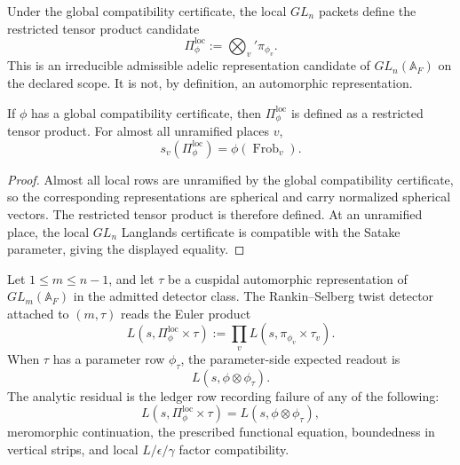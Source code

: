 \begin{definition}
\label{def:unified-reality-gln-local-tensor-product-candidate}
Under the global compatibility certificate, the local $GL_n$ packets
define the restricted tensor product candidate
$$
\Pi_{\phi}^{\mathrm{loc}}
:=
\bigotimes_v'\pi_{\phi_v}.
$$
This is an irreducible admissible adelic representation candidate of
$GL_n(\mathbb A_F)$ on the declared scope. It is not, by definition, an
automorphic representation.
\end{definition}

\begin{theorem}
\label{thm:unified-reality-gln-local-tensor-candidate-readout}
If $\phi$ has a global compatibility certificate, then
$\Pi_{\phi}^{\mathrm{loc}}$ is defined as a restricted tensor product.
For almost all unramified places $v$,
$$
s_v(\Pi_{\phi}^{\mathrm{loc}})
=
\phi(\operatorname{Frob}_v).
$$
\end{theorem}
\begin{proof}
Almost all local rows are unramified by the global compatibility
certificate, so the corresponding representations are spherical and
carry normalized spherical vectors. The restricted tensor product is
therefore defined. At an unramified place, the local $GL_n$ Langlands
certificate is compatible with the Satake parameter, giving the
displayed equality.
\end{proof}

\begin{definition}
\label{def:unified-reality-gln-rankin-selberg-twist-detector}
Let $1\le m\le n-1$, and let $\tau$ be a cuspidal automorphic
representation of $GL_m(\mathbb A_F)$ in the admitted detector class.
The Rankin--Selberg twist detector attached to $(m,\tau)$ reads the
Euler product
$$
L(s,\Pi_{\phi}^{\mathrm{loc}}\times\tau)
:=
\prod_v L(s,\pi_{\phi_v}\times\tau_v).
$$
When $\tau$ has a parameter row $\phi_{\tau}$, the parameter-side
expected readout is
$$
L(s,\phi\otimes\phi_{\tau}).
$$
The analytic residual is the ledger row recording failure of any of the
following:
$$
L(s,\Pi_{\phi}^{\mathrm{loc}}\times\tau)
=
L(s,\phi\otimes\phi_{\tau}),
$$
meromorphic continuation, the prescribed functional equation,
boundedness in vertical strips, and local $L/\epsilon/\gamma$ factor
compatibility.
\end{definition}

